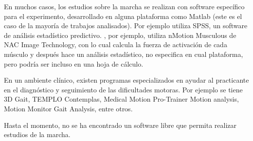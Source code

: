En muchos casos, los estudios sobre la marcha se realizan con software específico para el experimento, desarrollado en alguna plataforma como Matlab (este es el caso de la mayoría de trabajos analisados). Por ejemplo \cite{menz} utiliza SPSS, un software de análisis estadístico predictivo. \cite{takahiro}, por ejemplo, utiliza nMotion Musculous de NAC Image Technology, con lo cual calcula la fuerza de activación de cada músculo y después hace un análisis estadístico, no especifica en cual plataforma, pero podría ser incluso en una hoja de cálculo. 

En un ambiente clínico, existen programas especializados en ayudar al practicante en el diagnóstico y seguimiento de las dificultades motoras. Por ejemplo se tiene 3D Gait, TEMPLO Contemplas, Medical Motion Pro-Trainer Motion analysis, Motion Monitor Gait Analysis, entre otros.  

Hasta el momento, no se ha encontrado un software libre que permita realizar estudios de la marcha. 


